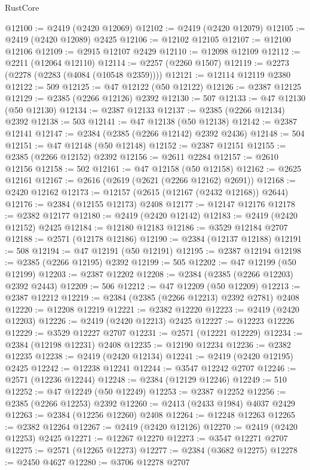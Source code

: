 \begin{lexlean}{RustCore}
\begin{coremodule}
@12100 := @2419 (@2420 @12069)
@12102 := @2419 (@2420 @12079)
@12105 := @2419 (@2420 @12089) @2425
@12106 := @12102 @12105
@12107 := @12100 @12106
@12109 := @2915 @12107 @2429
@12110 := @12098 @12109
@12112 := @2211 (@12064 @12110)
@12114 := @2257 (@2260 @1507)
@12119 := @2273 (@2278 (@2283 (@4084 (@10548 @2359))))
@12121 := @12114 @12119 @2380
@12122 := 509
@12125 := @47 @12122 (@50 @12122)
@12126 := @2387 @12125
@12129 := @2385 (@2266 @12126) @2392
@12130 := 507
@12133 := @47 @12130 (@50 @12130)
@12134 := @2387 @12133
@12137 := @2385 (@2266 @12134) @2392
@12138 := 503
@12141 := @47 @12138 (@50 @12138)
@12142 := @2387 @12141
@12147 := @2384 (@2385 (@2266 @12142) @2392 @2436)
@12148 := 504
@12151 := @47 @12148 (@50 @12148)
@12152 := @2387 @12151
@12155 := @2385 (@2266 @12152) @2392
@12156 := @2611 @2284
@12157 := @2610 @12156
@12158 := 502
@12161 := @47 @12158 (@50 @12158)
@12162 := @2625 @12161
@12167 := @2616 (@2619 (@2621 (@2266 @12162) @2691))
@12168 := @2420 @12162
@12173 := @12157 (@2615 (@12167 (@2432 @12168)) @2644)
@12176 := @2384 (@12155 @12173) @2408
@12177 := @12147 @12176
@12178 := @2382 @12177
@12180 := @2419 (@2420 @12142)
@12183 := @2419 (@2420 @12152) @2425
@12184 := @12180 @12183
@12186 := @3529 @12184 @2707
@12188 := @2571 (@12178 @12186)
@12190 := @2384 (@12137 @12188)
@12191 := 508
@12194 := @47 @12191 (@50 @12191)
@12195 := @2387 @12194
@12198 := @2385 (@2266 @12195) @2392
@12199 := 505
@12202 := @47 @12199 (@50 @12199)
@12203 := @2387 @12202
@12208 := @2384 (@2385 (@2266 @12203) @2392 @2443)
@12209 := 506
@12212 := @47 @12209 (@50 @12209)
@12213 := @2387 @12212
@12219 := @2384 (@2385 (@2266 @12213) @2392 @2781) @2408
@12220 := @12208 @12219
@12221 := @2382 @12220
@12223 := @2419 (@2420 @12203)
@12226 := @2419 (@2420 @12213) @2425
@12227 := @12223 @12226
@12229 := @3529 @12227 @2707
@12231 := @2571 (@12221 @12229)
@12234 := @2384 (@12198 @12231) @2408
@12235 := @12190 @12234
@12236 := @2382 @12235
@12238 := @2419 (@2420 @12134)
@12241 := @2419 (@2420 @12195) @2425
@12242 := @12238 @12241
@12244 := @3547 @12242 @2707
@12246 := @2571 (@12236 @12244)
@12248 := @2384 (@12129 @12246)
@12249 := 510
@12252 := @47 @12249 (@50 @12249)
@12253 := @2387 @12252
@12256 := @2385 (@2266 @12253) @2392
@12260 := @2413 (@2433 @1984) @4037 @2429
@12263 := @2384 (@12256 @12260) @2408
@12264 := @12248 @12263
@12265 := @2382 @12264
@12267 := @2419 (@2420 @12126)
@12270 := @2419 (@2420 @12253) @2425
@12271 := @12267 @12270
@12273 := @3547 @12271 @2707
@12275 := @2571 (@12265 @12273)
@12277 := @2384 (@3682 @12275)
@12278 := @2450 @4627
@12280 := @3706 @12278 @2707

\end{coremodule}
\end{lexlean}
